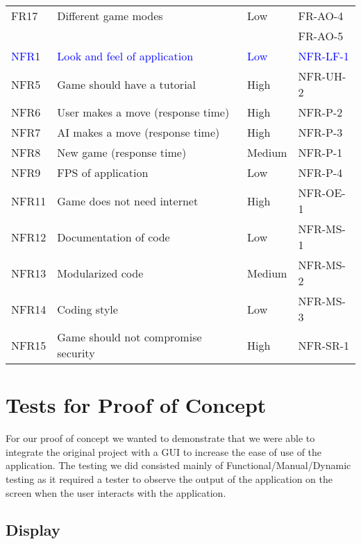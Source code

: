 \documentclass[12pt, titlepage]{article}
\begin{document}
\begin{table}[H]
\begin{center}
\begin{adjustwidth}{-1.5cm}{}
\begin{tabularx}{1.2\textwidth}{|p{3.4cm}|p{7cm}|p{1.6cm}|X|}
		\hline
		FR17 & Different game modes & Low & FR-AO-4\\
	     &  &  & FR-AO-5\\
		\hline
		\hline
		\textcolor{blue}{NFR}1 & \textcolor{blue}{Look and feel of application} & \textcolor{blue}{Low} & \textcolor{blue}{NFR-LF-1}\\
		\hline
		NFR5 & Game should have a tutorial & High & NFR-UH-2\\
		\hline
		NFR6 & User makes a move (response time) & High & NFR-P-2 \\
		\hline
		NFR7 & AI makes a move (response time) & High & NFR-P-3 \\
		\hline
		NFR8 & New game (response time) & Medium & NFR-P-1 \\
		\hline
		NFR9 & FPS of application & Low & NFR-P-4 \\
		\hline
		NFR11 & Game does not need internet & High & NFR-OE-1\\
		\hline
		NFR12 & Documentation of code & Low & NFR-MS-1 \\
		\hline
		NFR13 & Modularized code & Medium & NFR-MS-2 \\
		\hline
		NFR14 & Coding style & Low & NFR-MS-3 \\
		\hline
		NFR15 & Game should not compromise security & High & NFR-SR-1 \\
		\hline
	\end{tabularx}
	\end{adjustwidth}
	\end{center}
\end{table}

\newpage
\section{Tests for Proof of Concept}
For our proof of concept we wanted to demonstrate that we were able to integrate the original project with a GUI to increase the ease of use of the application. The testing we did consisted mainly of Functional/Manual/Dynamic testing as it required a tester to observe the output of the application on the screen when the user interacts with the application.

\subsection{Display}
		
\end{document}

